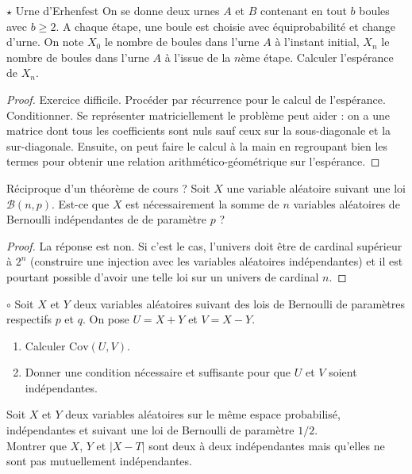 \documentclass[french,a4paper]{article}
\theoremstyle{plain}
\theoremstyle{definition}
\theoremstyle{remark}
\begin{document}
\begin{ex}{$\star$ Urne d'Erhenfest}
	On se donne deux urnes $A$ et $B$ contenant en tout $b$ boules avec $b\geqslant2$. A chaque étape, une boule est choisie avec équiprobabilité et change d'urne. On note $X_0$ le nombre de boules dans l'urne $A$ à l'instant initial, $X_n$ le nombre de boules dans l'urne $A$ à l'issue de la $n$ème étape. Calculer l'espérance de $X_n$.
\end{ex}
\begin{proof}
	Exercice difficile. Procéder par récurrence pour le calcul de l'espérance. Conditionner. Se représenter matriciellement le problème peut aider : on a une matrice dont tous les coefficients sont nuls sauf ceux sur la sous-diagonale et la sur-diagonale. Ensuite, on peut faire le calcul à la main en regroupant bien les termes pour obtenir une relation arithmético-géométrique sur l'espérance.
\end{proof}

\begin{ex}{Réciproque d'un théorème de cours ?}
	Soit $X$ une variable aléatoire suivant une loi $\mathcal{B}(n,p)$. Est-ce que $X$ est nécessairement la somme de $n$ variables aléatoires de Bernoulli indépendantes de de paramètre $p$ ?
\end{ex}
\begin{proof}
	La réponse est non. Si c'est le cas, l'univers doit être de cardinal supérieur à $2^n$ (construire une injection avec les variables aléatoires indépendantes) et il est pourtant possible d'avoir une telle loi sur un univers de cardinal $n$.
\end{proof}

\begin{ex}{$\circ$}
	Soit $X$ et $Y$ deux variables aléatoires suivant des lois de Bernoulli de paramètres respectifs $p$ et $q$. On pose $U=X+Y$ et $V=X-Y$.
	\begin{enumerate}
		\item Calculer $\text{Cov}(U,V)$.
		\item Donner une condition nécessaire et suffisante pour que $U$ et $V$ soient indépendantes.
	\end{enumerate}
\end{ex}

\begin{ex}{}
	Soit $X$ et $Y$ deux variables aléatoires sur le même espace probabilisé, indépendantes et suivant une loi de Bernoulli de paramètre $1/2$. \\ Montrer que $X$, $Y$ et $\lvert X-T\rvert$ sont deux à deux indépendantes mais qu'elles ne sont pas mutuellement indépendantes.
\end{ex}
\end{document}
